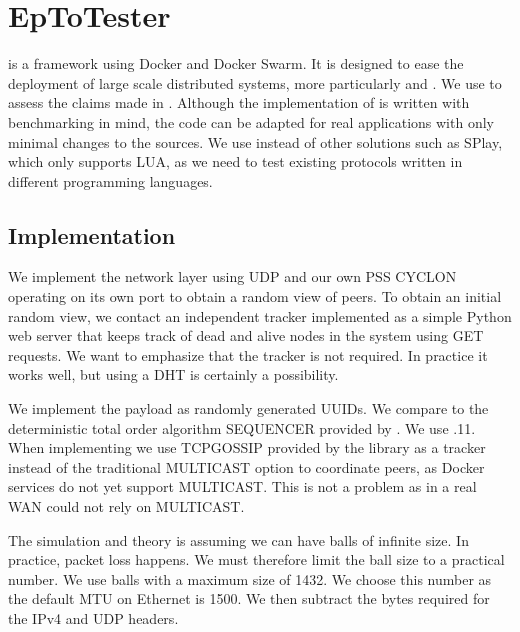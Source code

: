 \section{EpToTester}
\label{sec:epto}
\eptotester is a framework using Docker and Docker Swarm. It is designed to ease the deployment of large scale distributed systems, more particularly \jgroups and \epto. We use \eptotester to assess the claims made in \autocite{matos2015epto}. Although the implementation of \epto is written with benchmarking in mind, the code can be adapted for real applications with only minimal changes to the sources. We  use \eptotester instead of other solutions such as SPlay, which only supports LUA, as we need to test existing protocols written in different programming languages.
\subsection{Implementation}
We implement the network layer using UDP and our own PSS CYCLON operating on its own port to obtain a random view of peers. To obtain an initial random view, we contact an independent tracker implemented as a simple Python web server that keeps track of dead and alive nodes in the system using GET requests. We want to emphasize that the tracker is not required. In practice it works well, but using a DHT is certainly a possibility.

We implement the payload as randomly generated UUIDs. We compare \epto to the deterministic total order algorithm SEQUENCER provided by \jgroups. We use .11. When implementing \jgroups we use TCPGOSSIP \autocite{tcpgossip} provided by the \jgroups library as a tracker instead of the traditional MULTICAST option to coordinate peers, as Docker services do not yet support MULTICAST. This is not a problem as in a real WAN \jgroups could not rely on MULTICAST.

The \epto simulation and theory is assuming we can have balls of infinite size. In practice, packet loss happens. We must therefore limit the ball size to a practical number. We use balls with a maximum size of \SI{1432}{\byte}. We choose this number as the default MTU on Ethernet is \SI{1500}{\byte}. We then subtract the bytes required for the IPv4 and UDP headers.
